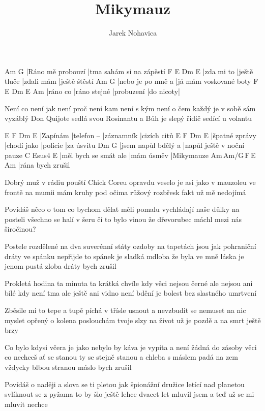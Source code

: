 \documentclass{song}
\title{Mikymauz}
\author{Jarek Nohavica}
\begin{document}
\begin{multicols}{2}

\strophe
Am                G
|Ráno mě probouzí |tma sahám si na zápěstí
F          E            Dm         E
|zda mi to |ještě tluče |zdali mám |ještě štěstí
Am                G
|nebo je po mně a |já mám voskované boty
F        E            Dm         E         Am
|ráno co |ráno stejné |probuzení |do nicoty|
\endstrophe

\strophe*
Není co není jak není proč není kam
není s kým není o čem každý je v sobě sám
vyzáblý Don Quijote sedlá svou Rosinantu
a Bůh je slepý řidič sedící u volantu
\endstrophe

E        F           Dm         E
|Zapínám |telefon -- |záznamník |cizích citů
E              F           Dm       E
|špatné zprávy |chodí jako |policie |za úsvitu
Dm                  G\7
|jsem napůl bdělý a |napůl ještě v noční pauze
C                     Esus4      E
|měl bych se smát ale |mám úsměv |Mikymauze
Am\,Am/G\,F\,E\,Am
|rána bych zrušil
\endstrophe

\strophe*
Dobrý muž v rádiu pouští Chick Coreu
opravdu veselo je asi jako v mauzoleu
ve frontě na mumii mám kruhy pod očima
růžový rozbřesk fakt už mě nedojímá
\endstrophe

\strophe*
Povídáš něco o tom co bychom dělat měli
pomalu vychládají naše důlky na posteli
všechno se halí v šeru čí to bylo vinou
že dřevorubec máchl mezi nás širočinou?
\endstrophe

Postele rozdělené na dva suverénní státy
ozdoby na tapetách jsou jak pohraniční dráty
ve spánku nepřijde to spánek je sladká mdloba
že byla ve mně láska je jenom pustá zloba
dráty bych zrušil
\endstrophe

\columnbreak

\strophe*
Prokletá hodina ta minuta ta krátká chvíle
kdy věci nejsou černé ale nejsou ani bílé
kdy není tma ale ještě ani vidno není
bdění je bolest bez slastného umrtvení
\endstrophe

\strophe*
Zběsile mi to tepe a tupě píchá v třísle
usnout a nevzbudit se nemuset na nic myslet
opřený o kolena poslouchám tvoje slzy
na život už je pozdě a na smrt ještě brzy
\endstrophe

Co bylo kdysi včera je jako nebylo by
káva je vypita a není žádná do zásoby
věci co nechceš ať se stanou ty se stejně stanou
a chleba s máslem padá na zem vždycky blbou stranou
máslo bych zrušil
\endstrophe

\strophe*
Povídáš o naději a slova se ti pletou
jak špionážní družice letící nad planetou
svlíknout se z pyžama to by šlo ještě lehce
dvacet let mluvil jsem a teď už se mi mluvit nechce
\endstrophe


\end{multicols}
\end{document}
